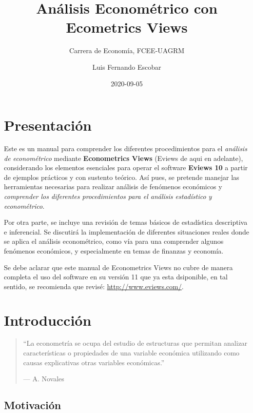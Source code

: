 \documentclass[
]{book}
\title{Análisis Econométrico con Ecometrics Views}
\subtitle{Carrera de Economía, FCEE-UAGRM}
\author{Luis Fernando Escobar}
\date{2020-09-05}
\begin{document}
\maketitle

{
\setcounter{tocdepth}{1}
\tableofcontents
}
\hypertarget{presentaciuxf3n}{%
\chapter*{Presentación}\label{presentaciuxf3n}}

Este es un manual para comprender los diferentes procedimientos para el \emph{análisis de econométrico} mediante \textbf{Econometrics Views} (Eviews de aqui en adelante), considerando los elementos esenciales para operar el software \textbf{Eviews 10} a partir de ejemplos prácticos y con sustento teórico. Así pues, se pretende manejar las herramientas necesarias para realizar análisis de fenómenos económicos y \emph{comprender los diferentes procedimientos para el análisis estadístico y econométrico}.

Por otra parte, se incluye una revisión de temas básicos de estadística descriptiva e inferencial. Se discutirá la implementación de diferentes situaciones reales donde se aplica el análisis econométrico, como vía para una comprender algunos fenómenos económicos, y especialmente en temas de finanzas y economía.

Se debe aclarar que este manual de Econometrics Views no cubre de manera completa el uso del software en su versión 11 que ya esta dsiponible, en tal sentido, se recomienda que revisé: \url{http://www.eviews.com/}.

\hypertarget{intro}{%
\chapter{Introducción}\label{intro}}

\begin{quote}
``La econometría se ocupa del estudio de estructuras que permitan analizar características o propiedades de una variable económica utilizando como causas explicativas otras variables económicas.''

--- A. Novales
\end{quote}

\hypertarget{motivaciuxf3n}{%
\section{Motivación}\label{motivaciuxf3n}}
\end{document}
